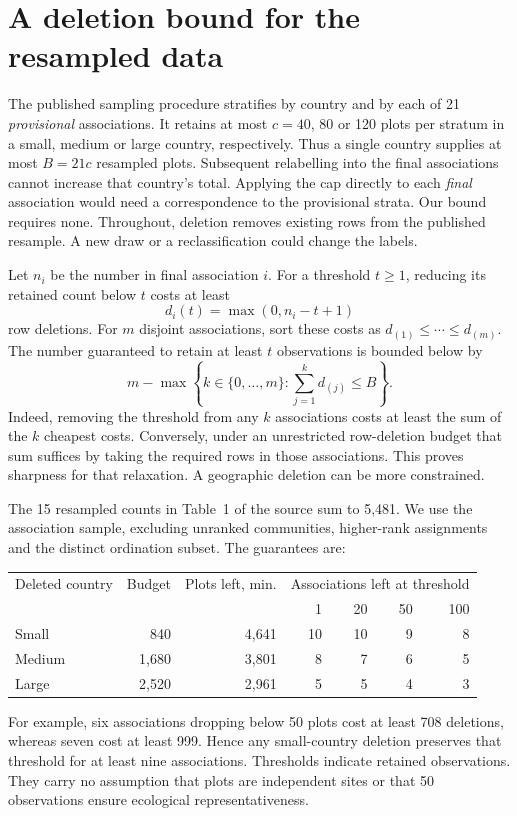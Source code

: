 \documentclass[11pt]{article}
\begin{document}
\section{A deletion bound for the resampled data}
The published sampling procedure stratifies by country and by each of 21 \emph{provisional} associations. It retains at most $c=40$, 80 or 120 plots per stratum in a small, medium or large country, respectively. Thus a single country supplies at most $B=21c$ resampled plots. Subsequent relabelling into the final associations cannot increase that country's total. Applying the cap directly to each \emph{final} association would need a correspondence to the provisional strata. Our bound requires none. Throughout, deletion removes existing rows from the published resample. A new draw or a reclassification could change the labels.

Let $n_i$ be the number in final association $i$. For a threshold $t\geq1$, reducing its retained count below $t$ costs at least
\[
d_i(t)=\max(0,n_i-t+1)
\]
row deletions. For $m$ disjoint associations, sort these costs as $d_{(1)}\leq\cdots\leq d_{(m)}$. The number guaranteed to retain at least $t$ observations is bounded below by
\[
m-\max\left\{k\in\{0,\ldots,m\}:\sum_{j=1}^{k} d_{(j)}\leq B\right\}.
\]
Indeed, removing the threshold from any $k$ associations costs at least the sum of the $k$ cheapest costs. Conversely, under an unrestricted row-deletion budget that sum suffices by taking the required rows in those associations. This proves sharpness for that relaxation. A geographic deletion can be more constrained.

The 15 resampled counts in Table~1 of the source sum to 5,481. We use the association sample, excluding unranked communities, higher-rank assignments and the distinct ordination subset. The guarantees are:
\begin{center}
\begin{tabular}{lrrrrrr}
\toprule
Deleted country & Budget & Plots left, min. & \multicolumn{4}{c}{Associations left at threshold}\\
& & & 1 & 20 & 50 & 100\\
\midrule
Small & 840 & 4,641 & 10 & 10 & 9 & 8\\
Medium & 1,680 & 3,801 & 8 & 7 & 6 & 5\\
Large & 2,520 & 2,961 & 5 & 5 & 4 & 3\\
\bottomrule
\end{tabular}
\end{center}
For example, six associations dropping below 50 plots cost at least 708 deletions, whereas seven cost at least 999. Hence any small-country deletion preserves that threshold for at least nine associations. Thresholds indicate retained observations. They carry no assumption that plots are independent sites or that 50 observations ensure ecological representativeness.
\end{document}
